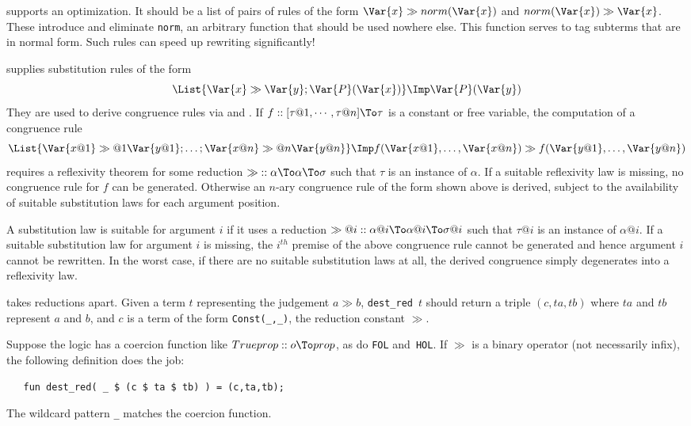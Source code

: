 \begin{ttdescription}
\item[\ttindexbold{norm_thms}] 
supports an optimization.  It should be a list of pairs of rules of the
form $\Var{x} \gg norm(\Var{x})$ and $norm(\Var{x}) \gg \Var{x}$.  These
introduce and eliminate {\tt norm}, an arbitrary function that should be
used nowhere else.  This function serves to tag subterms that are in normal
form.  Such rules can speed up rewriting significantly!

\item[\ttindexbold{subst_thms}] 
supplies substitution rules of the form
\[ \List{\Var{x} \gg \Var{y}; \Var{P}(\Var{x})} \Imp \Var{P}(\Var{y}) \]
They are used to derive congruence rules via  and
.  If $f :: [\tau@1,\cdots,\tau@n]\To\tau$ is a
constant or free variable, the computation of a congruence rule
\[\List{\Var{x@1} \gg@1 \Var{y@1}; \ldots; \Var{x@n} \gg@n \Var{y@n}}
\Imp f(\Var{x@1},\ldots,\Var{x@n}) \gg f(\Var{y@1},\ldots,\Var{y@n}) \]
requires a reflexivity theorem for some reduction ${\gg} ::
\alpha\To\alpha\To\sigma$ such that $\tau$ is an instance of $\alpha$.  If a
suitable reflexivity law is missing, no congruence rule for $f$ can be
generated.   Otherwise an $n$-ary congruence rule of the form shown above is
derived, subject to the availability of suitable substitution laws for each
argument position.  

A substitution law is suitable for argument $i$ if it
uses a reduction ${\gg@i} :: \alpha@i\To\alpha@i\To\sigma@i$ such that
$\tau@i$ is an instance of $\alpha@i$.  If a suitable substitution law for
argument $i$ is missing, the $i^{th}$ premise of the above congruence rule
cannot be generated and hence argument $i$ cannot be rewritten.  In the
worst case, if there are no suitable substitution laws at all, the derived
congruence simply degenerates into a reflexivity law.

\item[\ttindexbold{dest_red}] 
takes reductions apart.  Given a term $t$ representing the judgement
\mbox{$a \gg b$}, \verb$dest_red$~$t$ should return a triple $(c,ta,tb)$
where $ta$ and $tb$ represent $a$ and $b$, and $c$ is a term of the form
\verb$Const(_,_)$, the reduction constant $\gg$.  

Suppose the logic has a coercion function like $Trueprop::o\To prop$, as do
{\tt FOL} and~{\tt HOL}\@.  If $\gg$ is a binary operator (not necessarily
infix), the following definition does the job:
\begin{verbatim}
   fun dest_red( _ $ (c $ ta $ tb) ) = (c,ta,tb);
\end{verbatim}
The wildcard pattern {\tt_} matches the coercion function.
\end{ttdescription}


